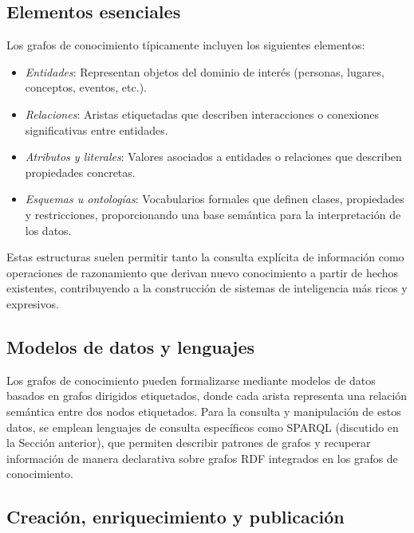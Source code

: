 \documentclass{article}
\begin{document}
\subsection{Elementos esenciales}

Los grafos de conocimiento típicamente incluyen los siguientes elementos:
\begin{itemize}
    \item \textit{Entidades}: Representan objetos del dominio de interés (personas, lugares, conceptos, eventos, etc.).
    \item \textit{Relaciones}: Aristas etiquetadas que describen interacciones o conexiones significativas entre entidades.
    \item \textit{Atributos y literales}: Valores asociados a entidades o relaciones que describen propiedades concretas.
    \item \textit{Esquemas u ontologías}: Vocabularios formales que definen clases, propiedades y restricciones, proporcionando una base semántica para la interpretación de los datos.
\end{itemize}

Estas estructuras suelen permitir tanto la consulta explícita de información como operaciones de razonamiento que derivan nuevo conocimiento a partir de hechos existentes, contribuyendo a la construcción de sistemas de inteligencia más ricos y expresivos.

\subsection{Modelos de datos y lenguajes}

Los grafos de conocimiento pueden formalizarse mediante modelos de datos basados en grafos dirigidos etiquetados, donde cada arista representa una relación semántica entre dos nodos etiquetados. Para la consulta y manipulación de estos datos, se emplean lenguajes de consulta específicos como SPARQL (discutido en la Sección anterior), que permiten describir patrones de grafos y recuperar información de manera declarativa sobre grafos RDF integrados en los grafos de conocimiento.

\subsection{Creación, enriquecimiento y publicación}
\end{document}
